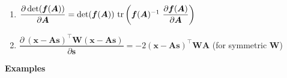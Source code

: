 \vspace{0.5cm}
\begin{enumerate}[resume*=vcalrules]
    \item $
        \dfrac{\partial \det(\bm{f}(\bm{A}))}{\partial \bm{A}}
        = \det(\bm{f}(\bm{A}))\ \tr\dParenBrac{\bm{f}(\bm{A})^{-1}\ \dfrac{\partial \bm{f}(\bm{A})}{\partial \bm{A}}}
    $
    \hfill \cite{mfml/book/mml/Deisenroth-Faisal-Ong}

    \item 
    $
        \dfrac{\partial\ (\bm{x} - \bm{As})^\top \bm{W} (\bm{x} - \bm{As})}{\partial\bm{s}}
        = -2(\bm{x} - \bm{As})^\top \bm{WA}
    $
    \hfill
    (for symmetric $\bm{W}$)
    \hfill \cite{mfml/book/mml/Deisenroth-Faisal-Ong}
\end{enumerate}


\vspace{0.5cm}
\textbf{Examples}
